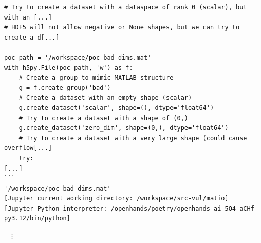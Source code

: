 \begin{tcolorbox}[enhanced,title={Example of compiling the project and constructing PoCs with Python}]
\begin{verbatim}
# Try to create a dataset with a dataspace of rank 0 (scalar), but with an [...]
# HDF5 will not allow negative or None shapes, but we can try to create a d[...]

poc_path = '/workspace/poc_bad_dims.mat'
with h5py.File(poc_path, 'w') as f:
    # Create a group to mimic MATLAB structure
    g = f.create_group('bad')
    # Create a dataset with an empty shape (scalar)
    g.create_dataset('scalar', shape=(), dtype='float64')
    # Try to create a dataset with a shape of (0,)
    g.create_dataset('zero_dim', shape=(0,), dtype='float64')
    # Try to create a dataset with a very large shape (could cause overflow[...]
    try:
[...]
```
'/workspace/poc_bad_dims.mat'
[Jupyter current working directory: /workspace/src-vul/matio]
[Jupyter Python interpreter: /openhands/poetry/openhands-ai-5O4_aCHf-py3.12/bin/python]
\end{verbatim}
\noindent
$\quad\vdots$

\end{tcolorbox}
